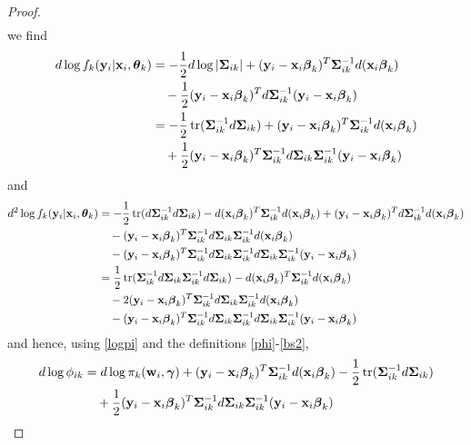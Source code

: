 \begin{proof}
\begin{align*}
\end{align*}
we find 
\begin{align*}
d\log f_{k}(\mathbf y_i|\mathbf x_{i},\boldsymbol\theta_{k})&=-\frac{1}{2}d\log|\boldsymbol\Sigma_{ik}|+(\mathbf y_i-\mathbf x_{i}\boldsymbol \beta_{k})^{T}\boldsymbol\Sigma_{ik}^{-1}d(\mathbf x_{i}\boldsymbol \beta_{k})\\
&\quad-\frac{1}{2}(\mathbf y_i-\mathbf x_{i}\boldsymbol \beta_{k})^{T}d\boldsymbol\Sigma_{ik}^{-1}(\mathbf y_i-\mathbf x_{i}\boldsymbol\beta_{k})\\
&=-\frac{1}{2}\operatorname{tr}(\boldsymbol\Sigma_{ik}^{-1}d\boldsymbol\Sigma_{ik})+(\mathbf y_i-\mathbf x_{i}\boldsymbol \beta_{k})^{T}\boldsymbol\Sigma_{ik}^{-1}d(\mathbf x_{i}\boldsymbol \beta_{k})\\
&\quad+\frac{1}{2}(\mathbf y_i-\mathbf x_{i}\boldsymbol \beta_{k})^{T}\boldsymbol\Sigma_{ik}^{-1}d\boldsymbol\Sigma_{ik}\boldsymbol\Sigma_{ik}^{-1}(\mathbf y_i-\mathbf x_{i}\boldsymbol\beta_{k})\\
\end{align*}
and
\begin{align*}
d^{2}\log f_{k}(\mathbf y_i|\mathbf x_{i},\boldsymbol\theta_{k})&=-\frac{1}{2}\operatorname{tr}(d\boldsymbol\Sigma_{ik}^{-1}d\boldsymbol\Sigma_{ik})-d(\mathbf x_{i}\boldsymbol \beta_{k})^{T}\boldsymbol\Sigma_{ik}^{-1}d(\mathbf x_{i}\boldsymbol \beta_{k})+(\mathbf y_i-\mathbf x_{i}\boldsymbol \beta_{k})^{T}d\boldsymbol\Sigma_{ik}^{-1}d(\mathbf x_{i}\boldsymbol \beta_{k})\\
&\quad-(\mathbf y_i-\mathbf x_{i}\boldsymbol \beta_{k})^{T}\boldsymbol\Sigma_{ik}^{-1}d\boldsymbol\Sigma_{ik}\boldsymbol\Sigma_{ik}^{-1}d(\mathbf x_{i}\boldsymbol\beta_{k})\\
&\quad-(\mathbf y_i-\mathbf x_{i}\boldsymbol \beta_{k})^{T}\boldsymbol\Sigma_{ik}^{-1}d\boldsymbol\Sigma_{ik}\boldsymbol\Sigma_{ik}^{-1}d\boldsymbol\Sigma_{ik}\boldsymbol\Sigma_{ik}^{-1}(\mathbf y_i-\mathbf x_{i}\boldsymbol\beta_{k})\\
&=\frac{1}{2}\operatorname{tr}(\boldsymbol\Sigma_{ik}^{-1}d\boldsymbol\Sigma_{ik}\boldsymbol\Sigma_{ik}^{-1}d\boldsymbol\Sigma_{ik})-d(\mathbf x_{i}\boldsymbol \beta_{k})^{T}\boldsymbol\Sigma_{ik}^{-1}d(\mathbf x_{i}\boldsymbol \beta_{k})\\
&\quad-2(\mathbf y_i-\mathbf x_{i}\boldsymbol \beta_{k})^{T}\boldsymbol\Sigma_{ik}^{-1}d\boldsymbol\Sigma_{ik}\boldsymbol\Sigma_{ik}^{-1}d(\mathbf x_{i}\boldsymbol\beta_{k})\\
&\quad-(\mathbf y_i-\mathbf x_{i}\boldsymbol \beta_{k})^{T}\boldsymbol\Sigma_{ik}^{-1}d\boldsymbol\Sigma_{ik}\boldsymbol\Sigma_{ik}^{-1}d\boldsymbol\Sigma_{ik}\boldsymbol\Sigma_{ik}^{-1}(\mathbf y_i-\mathbf x_{i}\boldsymbol\beta_{k})\\
\end{align*}
and hence, using \eqref{logpi} and the definitions \eqref{phi}-\eqref{bs2},
\begin{align*}
d\log \phi_{ik}&=d\log \pi_{k}(\B w_{i},\BS\gamma)+(\B y_{i}-\B x_{i}\BS \beta_{k})^{T}\BS\Sigma_{ik}^{-1}d(\B x_{i}\BS \beta_{k})-\frac{1}{2}\tr(\BS\Sigma_{ik}^{-1}d\BS\Sigma_{ik})\\
&\quad+\frac{1}{2}(\B y_{i}-\B x_{i}\BS \beta_{k})^{T}\BS\Sigma_{ik}^{-1}d\BS\Sigma_{ik}\BS\Sigma_{ik}^{-1}(\B y_{i}-\B x_{i}\BS\beta_{k})\\

\end{align*}
\end{proof}
